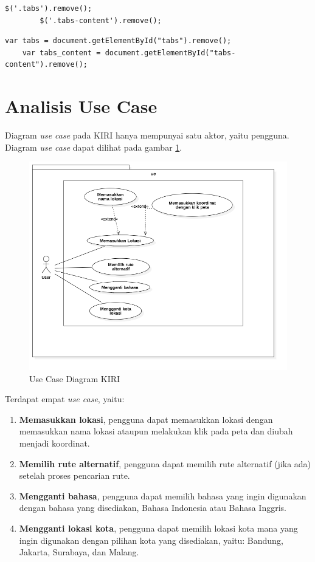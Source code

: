 \begin{lstlisting}[caption=Mendapatkan elemen View pada JavaScript PHP,label = {lst_3_elem_PHP}]
		$('.tabs').remove();
		$('.tabs-content').remove();
\end{lstlisting}

\begin{lstlisting}[caption=Mendapatkan elemen View pada JavaScript \play,label = {lst_3_elem_play}]
    var tabs = document.getElementById("tabs").remove();
    var tabs_content = document.getElementById("tabs-content").remove();
\end{lstlisting}


\section{Analisis Use Case}
\label{sec:usecase}
Diagram \textit{use case} pada KIRI hanya mempunyai satu aktor, yaitu pengguna. Diagram \textit{use case} dapat dilihat pada gambar \ref{fig:3_usecase}.

\begin{figure}[H]
	\centering
	\includegraphics[scale=0.5]{Gambar/usecase}
	\caption{Use Case Diagram KIRI} 
	\label{fig:3_usecase}
\end{figure}

Terdapat empat \textit{use case}, yaitu:
\begin{enumerate}
	\item \textbf{Memasukkan lokasi}, pengguna dapat memasukkan lokasi dengan memasukkan nama lokasi ataupun melakukan klik pada peta dan diubah menjadi koordinat.
	\item \textbf{Memilih rute alternatif}, pengguna dapat memilih rute alternatif (jika ada) setelah proses pencarian rute.
	\item \textbf{Mengganti bahasa}, pengguna dapat memilih bahasa yang ingin digunakan dengan bahasa yang disediakan, Bahasa Indonesia atau Bahasa Inggris.
	\item \textbf{Mengganti lokasi kota}, pengguna dapat memilih lokasi kota mana yang ingin digunakan dengan pilihan kota yang disediakan, yaitu: Bandung, Jakarta, Surabaya, dan Malang.
	
\end{enumerate}

